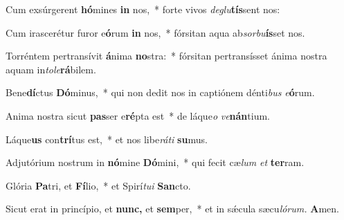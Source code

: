 \item Cum exsúrgerent \textbf{hó}mines \textbf{in} nos,~* forte vivos \textit{deglu}\textbf{tís}sent nos:
\item Cum irascerétur furor e\textbf{ó}rum \textbf{in} nos,~* fórsitan aqua ab\tinyhspace\textit{sorbu}\textbf{ís}set nos.
\item Torréntem pertransívit \textbf{á}nima \textbf{no}stra:~* fórsitan pertransísset ánima nostra aquam in\tinyhspace\textit{tole}\textbf{rá}bilem.
\item Bene\textbf{dí}ctus \textbf{Dó}minus,~* qui non dedit nos in captiónem dénti\textit{bus} \textit{e}\textbf{ó}rum.
\item Anima nostra sicut \textbf{pas}ser e\textbf{ré}pta est~* de láque\tinyhspace\textit{o} \textit{ve}\textbf{nán}tium.
\item Láque\textbf{us} con\textbf{trí}tus est,~* et nos libe\tinyhspace\textit{ráti} \textbf{su}mus.
\item Adjutórium nostrum in \textbf{nó}mine \textbf{Dó}mini,~* qui fecit cæ\tinyhspace\textit{lum} \textit{et} \textbf{ter}ram.
\item Glória \textbf{Pa}tri, et \textbf{Fí}lio,~* et Spirí\tinyhspace\textit{tui} \textbf{San}cto.
\item Sicut erat in princípio, et \textbf{nunc,} et \textbf{sem}per,~* et in sǽcula sæcu\textit{lórum.} \textbf{A}men.